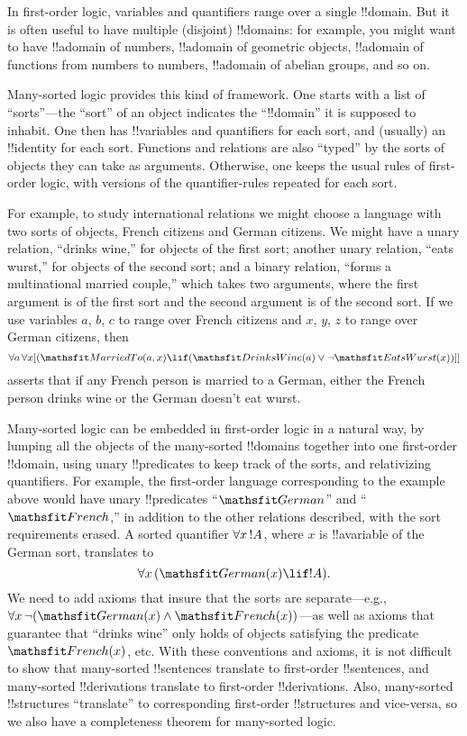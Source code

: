 \documentclass[../../../include/open-logic-section]{subfiles}
\begin{document}


In first-order logic, variables and quantifiers range over a single
!!{domain}. But it is often useful to have multiple (disjoint)
!!{domain}s: for example, you might want to have !!a{domain} of numbers,
!!a{domain} of geometric objects, !!a{domain} of functions from
numbers to numbers, !!a{domain} of abelian groups, and so on.

Many-sorted logic provides this kind of framework. One starts with a
list of ``sorts''---the ``sort'' of an object indicates the
``!!{domain}'' it is supposed to inhabit. One then has !!{variable}s
and quantifiers for each sort, and (usually) an !!{identity} for each
sort. Functions and relations are also ``typed'' by the sorts of
objects they can take as arguments. Otherwise, one keeps the usual
rules of first-order logic, with versions of the quantifier-rules
repeated for each sort.

For example, to study international relations we might choose a
language with two sorts of objects, French citizens and German
citizens. We might have a unary relation, ``drinks wine,'' for objects
of the first sort; another unary relation, ``eats wurst,'' for objects
of the second sort; and a binary relation, ``forms a multinational
married couple,'' which takes two arguments, where the first argument
is of the first sort and the second argument is of the second sort. If
we use variables $a$, $b$, $c$ to range over French citizens and $x$, $y$, $z$
to range over German citizens, then
\[
\lforall[a][\lforall x][(\Atom{\Obj{MarriedTo}}{a,x} \lif
(\Atom{\Obj{DrinksWine}}{a} \lor \lnot \Atom{\Obj{EatsWurst}}{x})]]
\]
asserts that if any French person is married to a German, either the
French person drinks wine or the German doesn't eat wurst.

Many-sorted logic can be embedded in first-order logic in a natural
way, by lumping all the objects of the many-sorted !!{domain}s together
into one first-order !!{domain}, using unary !!{predicate}s to keep track of
the sorts, and relativizing quantifiers. For example, the first-order
language corresponding to the example above would have unary !!{predicate}s
``$\Obj{German}$'' and ``$\Obj{French}$,'' in addition to the other relations
described, with the sort requirements erased. A sorted quantifier $\lforall[x][!A]$, where $x$ is !!a{variable} of the German sort, translates to
\[
\lforall[x][(\Atom{\Obj{German}}{x} \lif !A)].
\]
We need to add axioms that insure that the sorts are separate---e.g.,
$\lforall[x][\lnot (\Atom{\Obj{German}}{x} \land
  \Atom{\Obj{French}}{x})]$---as well as axioms that guarantee that
``drinks wine'' only holds of objects satisfying the predicate
$\Atom{\Obj{French}}{x}$, etc. With these conventions and axioms, it
is not difficult to show that many-sorted !!{sentence}s translate to
first-order !!{sentence}s, and many-sorted !!{derivation}s translate
to first-order !!{derivation}s. Also, many-sorted !!{structure}s
``translate'' to corresponding first-order !!{structure}s and
vice-versa, so we also have a completeness theorem for many-sorted
logic.
\end{document}
